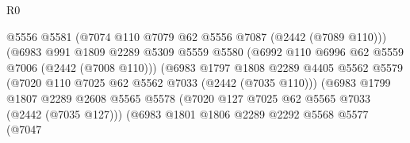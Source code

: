 \begin{lexlean}{R0}
\begin{coremodule}
                                          @5556
                                          @5581
                                          (@7074 @110 @7079 @62 @5556 @7087 (@2442 (@7089 @110)))
                                          (@6983
                                            @991
                                            @1809
                                            @2289
                                            @5309
                                            @5559
                                            @5580
                                            (@6992 @110 @6996 @62 @5559 @7006 (@2442 (@7008 @110)))
                                            (@6983
                                              @1797
                                              @1808
                                              @2289
                                              @4405
                                              @5562
                                              @5579
                                              (@7020
                                                @110
                                                @7025
                                                @62
                                                @5562
                                                @7033
                                                (@2442 (@7035 @110)))
                                              (@6983
                                                @1799
                                                @1807
                                                @2289
                                                @2608
                                                @5565
                                                @5578
                                                (@7020
                                                  @127
                                                  @7025
                                                  @62
                                                  @5565
                                                  @7033
                                                  (@2442 (@7035 @127)))
                                                (@6983
                                                  @1801
                                                  @1806
                                                  @2289
                                                  @2292
                                                  @5568
                                                  @5577
                                                  (@7047

\end{coremodule}
\end{lexlean}

